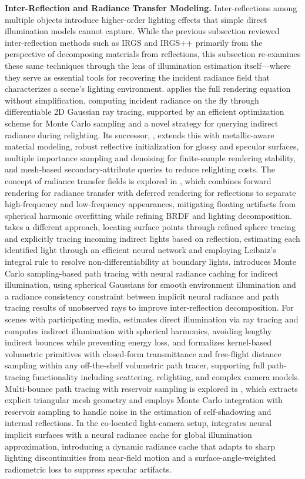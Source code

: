 \documentclass[11pt]{article}
\begin{document}
\textbf{Inter-Reflection and Radiance Transfer Modeling.} Inter-reflections among multiple objects introduce higher-order lighting effects that simple direct illumination models cannot capture. While the previous subsection reviewed inter-reflection methods such as IRGS and IRGS++ primarily from the perspective of decomposing materials from reflections, this subsection re-examines these same techniques through the lens of illumination estimation itself---where they serve as essential tools for recovering the incident radiance field that characterizes a scene's lighting environment. \cite{ref572} applies the full rendering equation without simplification, computing incident radiance on the fly through differentiable 2D Gaussian ray tracing, supported by an efficient optimization scheme for Monte Carlo sampling and a novel strategy for querying indirect radiance during relighting. Its successor, \cite{ref575}, extends this with metallic-aware material modeling, robust reflective initialization for glossy and specular surfaces, multiple importance sampling and denoising for finite-sample rendering stability, and mesh-based secondary-attribute queries to reduce relighting costs. The concept of radiance transfer fields is explored in \cite{ref588}, which combines forward rendering for radiance transfer with deferred rendering for reflections to separate high-frequency and low-frequency appearances, mitigating floating artifacts from spherical harmonic overfitting while refining BRDF and lighting decomposition. \cite{ref589} takes a different approach, locating surface points through refined sphere tracing and explicitly tracing incoming indirect lights based on reflection, estimating each identified light through an efficient neural network and employing Leibniz's integral rule to resolve non-differentiability at boundary lights. \cite{ref590} introduces Monte Carlo sampling-based path tracing with neural radiance caching for indirect illumination, using spherical Gaussians for smooth environment illumination and a radiance consistency constraint between implicit neural radiance and path tracing results of unobserved rays to improve inter-reflection decomposition. For scenes with participating media, \cite{ref591} estimates direct illumination via ray tracing and computes indirect illumination with spherical harmonics, avoiding lengthy indirect bounces while preventing energy loss, and \cite{ref592} formalizes kernel-based volumetric primitives with closed-form transmittance and free-flight distance sampling within any off-the-shelf volumetric path tracer, supporting full path-tracing functionality including scattering, relighting, and complex camera models. Multi-bounce path tracing with reservoir sampling is explored in \cite{ref593}, which extracts explicit triangular mesh geometry and employs Monte Carlo integration with reservoir sampling to handle noise in the estimation of self-shadowing and internal reflections. In the co-located light-camera setup, \cite{ref594} integrates neural implicit surfaces with a neural radiance cache for global illumination approximation, introducing a dynamic radiance cache that adapts to sharp lighting discontinuities from near-field motion and a surface-angle-weighted radiometric loss to suppress specular artifacts.
\end{document}
